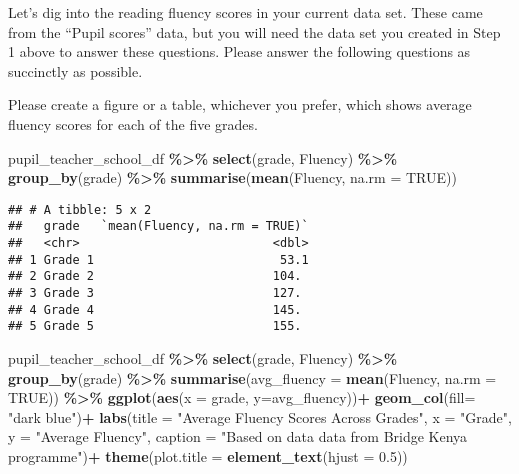 \documentclass[
]{article}
\newenvironment{Shaded}{\begin{snugshade}}{\end{snugshade}}
\newcommand{\AttributeTok}[1]{\textcolor[rgb]{0.13,0.29,0.53}{#1}}
\newcommand{\ConstantTok}[1]{\textcolor[rgb]{0.56,0.35,0.01}{#1}}
\newcommand{\FloatTok}[1]{\textcolor[rgb]{0.00,0.00,0.81}{#1}}
\newcommand{\FunctionTok}[1]{\textcolor[rgb]{0.13,0.29,0.53}{\textbf{#1}}}
\newcommand{\NormalTok}[1]{#1}
\newcommand{\SpecialCharTok}[1]{\textcolor[rgb]{0.81,0.36,0.00}{\textbf{#1}}}
\newcommand{\StringTok}[1]{\textcolor[rgb]{0.31,0.60,0.02}{#1}}
\begin{document}
Let's dig into the reading fluency scores in your current data set.
These came from the ``Pupil scores'' data, but you will need the data
set you created in Step 1 above to answer these questions. Please answer
the following questions as succinctly as possible.

Please create a figure or a table, whichever you prefer, which shows
average fluency scores for each of the five grades.

\begin{Shaded}
\begin{Highlighting}[]
\NormalTok{pupil\_teacher\_school\_df }\SpecialCharTok{\%\textgreater{}\%}
  \FunctionTok{select}\NormalTok{(grade, Fluency) }\SpecialCharTok{\%\textgreater{}\%}
  \FunctionTok{group\_by}\NormalTok{(grade) }\SpecialCharTok{\%\textgreater{}\%}
  \FunctionTok{summarise}\NormalTok{(}\FunctionTok{mean}\NormalTok{(Fluency, }\AttributeTok{na.rm =} \ConstantTok{TRUE}\NormalTok{))}
\end{Highlighting}
\end{Shaded}

\begin{verbatim}
## # A tibble: 5 x 2
##   grade   `mean(Fluency, na.rm = TRUE)`
##   <chr>                           <dbl>
## 1 Grade 1                          53.1
## 2 Grade 2                         104. 
## 3 Grade 3                         127. 
## 4 Grade 4                         145. 
## 5 Grade 5                         155.
\end{verbatim}

\begin{Shaded}
\begin{Highlighting}[]
\NormalTok{pupil\_teacher\_school\_df }\SpecialCharTok{\%\textgreater{}\%}
  \FunctionTok{select}\NormalTok{(grade, Fluency) }\SpecialCharTok{\%\textgreater{}\%}
  \FunctionTok{group\_by}\NormalTok{(grade) }\SpecialCharTok{\%\textgreater{}\%}
  \FunctionTok{summarise}\NormalTok{(}\AttributeTok{avg\_fluency =} \FunctionTok{mean}\NormalTok{(Fluency, }\AttributeTok{na.rm =} \ConstantTok{TRUE}\NormalTok{)) }\SpecialCharTok{\%\textgreater{}\%}
  \FunctionTok{ggplot}\NormalTok{(}\FunctionTok{aes}\NormalTok{(}\AttributeTok{x =}\NormalTok{ grade, }\AttributeTok{y=}\NormalTok{avg\_fluency))}\SpecialCharTok{+}
  \FunctionTok{geom\_col}\NormalTok{(}\AttributeTok{fill=} \StringTok{"dark blue"}\NormalTok{)}\SpecialCharTok{+}
  \FunctionTok{labs}\NormalTok{(}\AttributeTok{title =} \StringTok{"Average Fluency Scores Across Grades"}\NormalTok{,}
       \AttributeTok{x =} \StringTok{"Grade"}\NormalTok{,}
       \AttributeTok{y =} \StringTok{"Average Fluency"}\NormalTok{,}
       \AttributeTok{caption =} \StringTok{"Based on data data from Bridge Kenya programme"}\NormalTok{)}\SpecialCharTok{+}
  \FunctionTok{theme}\NormalTok{(}\AttributeTok{plot.title =} \FunctionTok{element\_text}\NormalTok{(}\AttributeTok{hjust =} \FloatTok{0.5}\NormalTok{))}
\end{Highlighting}
\end{Shaded}
\end{document}
